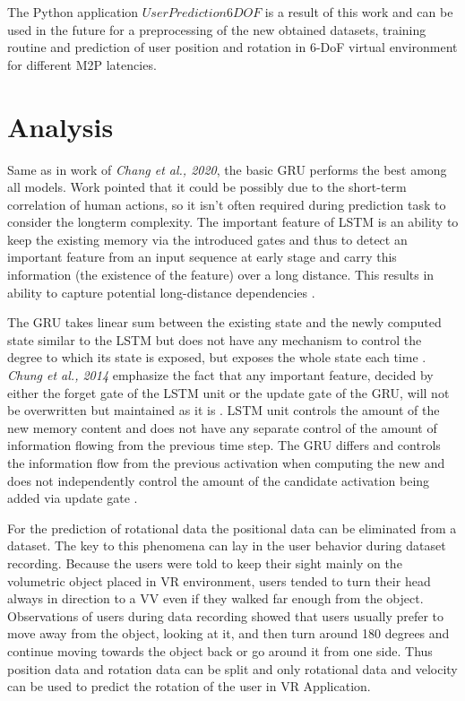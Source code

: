 The Python application $UserPrediction6DOF$ is a result of this work and can be used in the future for a preprocessing of the new obtained datasets, training routine and prediction of user position and rotation in 6-DoF virtual environment for different M2P latencies. 

\section{Analysis}
\label{sec:conclusion:analysis}
Same as in work of \textit{Chang et al., 2020}, the basic GRU performs the best among all models. Work \cite{6DoF_Tracking} pointed that it could be possibly due to the short-term correlation of human actions, so it isn’t often required during prediction task to consider the longterm complexity. The important feature of LSTM is an ability to keep the existing memory via the introduced gates and thus to detect an important feature from an input sequence at early stage and carry this information (the existence of the feature) over a long distance. This results in ability to capture potential long-distance dependencies \cite{empirical_evaluation}. 

The GRU takes linear sum between the existing state and the newly computed state similar to the LSTM but does not have any mechanism to control the degree to which its state is exposed, but exposes the whole state each time \cite{empirical_evaluation}. \textit{Chung et al., 2014} emphasize the fact that any important feature, decided by either the forget gate of the LSTM unit or the update gate of the GRU, will not be overwritten but maintained as it is \cite{empirical_evaluation}. LSTM unit controls the amount of the new memory content and does not have any separate control of the amount of information flowing from the previous time step. The GRU differs and controls the information flow from the previous activation when computing the new and does not independently control the amount of the candidate activation being added via update gate \cite{empirical_evaluation}. 

For the prediction of rotational data the positional data can be eliminated from a dataset. The key to this phenomena can lay in the user behavior during dataset recording. Because the users were told to keep their sight mainly on the volumetric object placed in VR environment, users tended to turn their head always in direction to a VV even if they walked far enough from the object. Observations of users during data recording showed that users usually prefer to move away from the object, looking at it, and then turn around 180 degrees and continue moving towards the object back or go around it from one side. Thus position data and rotation data can be split and only rotational data and velocity can be used to predict the rotation of the user in VR Application.

